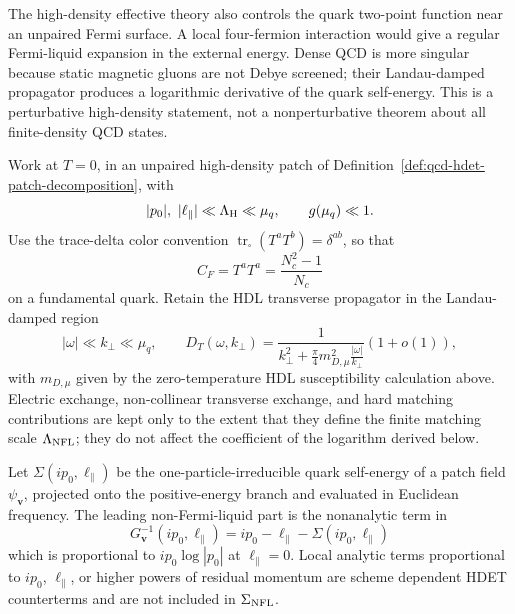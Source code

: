 The high-density effective theory also controls the quark two-point function
near an unpaired Fermi surface.  A local four-fermion interaction would give a
regular Fermi-liquid expansion in the external energy.  Dense QCD is more
singular because static magnetic gluons are not Debye screened; their
Landau-damped propagator produces a logarithmic derivative of the quark
self-energy.  This is a perturbative high-density statement, not a
nonperturbative theorem about all finite-density QCD states.

\begin{controlledapproximation}
\label{ca:qcd-hdl-non-fermi-liquid-regime}
Work at \(T=0\), in an unpaired high-density patch of
Definition~\ref{def:qcd-hdet-patch-decomposition}, with
\[
  |p_0|,\ |\ell_\parallel|\ll \Lambda_{\rm H}\ll\mu_q,
  \qquad
  g(\mu_q)\ll1 .
\]
Use the trace-delta color convention
\(\operatorname{tr}_{\square}(T^aT^b)=\delta^{ab}\), so that
\begin{equation}
  C_F=T^aT^a=\frac{N_c^2-1}{N_c}
  \label{eq:qcd-trace-delta-fundamental-casimir}
\end{equation}
on a fundamental quark.  Retain the HDL transverse propagator in the
Landau-damped region
\begin{equation}
  |\omega|\ll k_\perp\ll\mu_q,
  \qquad
  D_T(\omega,k_\perp)
  =
  \frac{1}{
    k_\perp^2
    +\frac{\pi}{4}m_{D,\mu}^2\frac{|\omega|}{k_\perp}
  }
  \left(1+o(1)\right),
  \label{eq:qcd-nfl-landau-damped-propagator}
\end{equation}
with \(m_{D,\mu}\) given by the zero-temperature HDL susceptibility
calculation above.  Electric exchange,
non-collinear transverse exchange, and hard matching contributions are kept
only to the extent that they define the finite matching scale
\(\Lambda_{\rm NFL}\); they do not affect the coefficient of the logarithm
derived below.
\end{controlledapproximation}

\begin{definition}
\label{def:qcd-leading-nfl-self-energy}
Let \(\Sigma(ip_0,\ell_\parallel)\) be the one-particle-irreducible quark
self-energy of a patch field \(\psi_{\mathbf v}\), projected onto the
positive-energy branch and evaluated in Euclidean frequency.  The leading
non-Fermi-liquid part is the nonanalytic term in
\[
  G_{\mathbf v}^{-1}(ip_0,\ell_\parallel)
  =
  ip_0-\ell_\parallel-\Sigma(ip_0,\ell_\parallel)
\]
which is proportional to \(ip_0\log |p_0|\) at
\(\ell_\parallel=0\).  Local analytic terms proportional to \(ip_0\),
\(\ell_\parallel\), or higher powers of residual momentum are scheme
dependent HDET counterterms and are not included in
\(\Sigma_{\rm NFL}\).
\end{definition}

